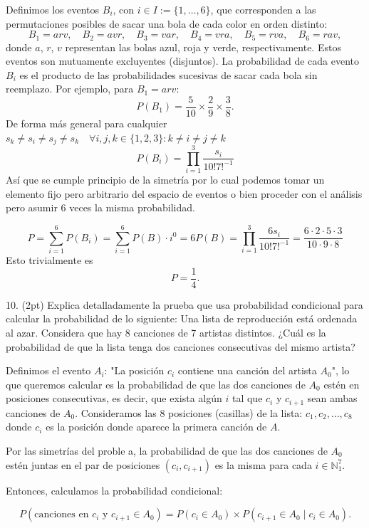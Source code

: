 Definimos los eventos \(B_i\), con \(i \in I:= \{1, \ldots, 6\} \), que corresponden a las permutaciones posibles de sacar una bola de cada color en orden distinto:
\[
B_1 = arv, \quad B_2 = avr, \quad B_3 = var, \quad B_4 = vra, \quad B_5 = rva, \quad B_6 = rav,
\]
donde \(a\), \(r\), \(v\) representan las bolas azul, roja y verde, respectivamente. Estos eventos son mutuamente excluyentes (disjuntos).
La probabilidad de cada evento \(B_i\) es el producto de las probabilidades sucesivas de sacar cada bola sin reemplazo. Por ejemplo, para \(B_1 = arv\):
\[
P(B_1) = \frac{5}{10} \times \frac{2}{9} \times \frac{3}{8}.
\]
De forma más general para cualquier $ s_k \neq s_i \neq s_j \neq s_k \quad\forall i,j, k \in \{1, 2, 3\}: k \neq i \neq j \neq k$
\[
P(B_i) = \prod_{i=1}^3 \frac{s_i}{10!7!^{-1}}
\]
Así que se cumple principio de la simetría por lo cual podemos tomar un elemento fijo pero arbitrario del espacio de eventos o bien proceder con el análisis pero asumir 6 veces la misma probabilidad.

\[
P = \sum_{i=1}^6 P(B_i) = \sum_{i=1}^6 P(B) \cdot i^0 = 6P(B) = \prod_{i=1}^3 \frac{6s_i}{10!7!^{-1}} = \frac{6 \cdot 2 \cdot 5 \cdot 3}{10 \cdot 9 \cdot 8}
\]
Esto trivialmente es
\[
P = \frac{1}{4}.
\]


10. (2pt) Explica detalladamente la prueba que usa probabilidad condicional para calcular la probabilidad de lo siguiente: Una lista de reproducción está ordenada al azar. Considera que hay 8 canciones de 7 artistas distintos. ¿Cuál es la probabilidad de que la lista tenga dos canciones consecutivas del mismo artista?

Definimos el evento \(A_i\): "La posición \(c_i\) contiene una canción del artista \(A_0\)", lo que queremos calcular es la probabilidad de que las dos canciones de \(A_0\) estén en posiciones consecutivas, es decir, que exista algún \(i\) tal que \(c_i\) y \(c_{i+1}\) sean ambas canciones de \(A_0\). Consideramos las 8 posiciones (casillas) de la lista: \(c_1, c_2, \ldots, c_8\) donde \(c_i\) es la posición donde aparece la primera canción de \(A\).

Por las simetrías del proble a, la probabilidad de que las dos canciones de \(A_0\) estén juntas en el par de posiciones \((c_i, c_{i+1})\) es la misma para cada \(i \in \mathbb{N}_1^7\).


Entonces, calculamos la probabilidad condicional:


\[
P(\text{canciones en } c_{i} \text{ y } c_{i+1} \in A_0) = P(c_i \in A_0) \times P(c_{i+1} \in A_0 \mid c_i \in A_0).
\]

